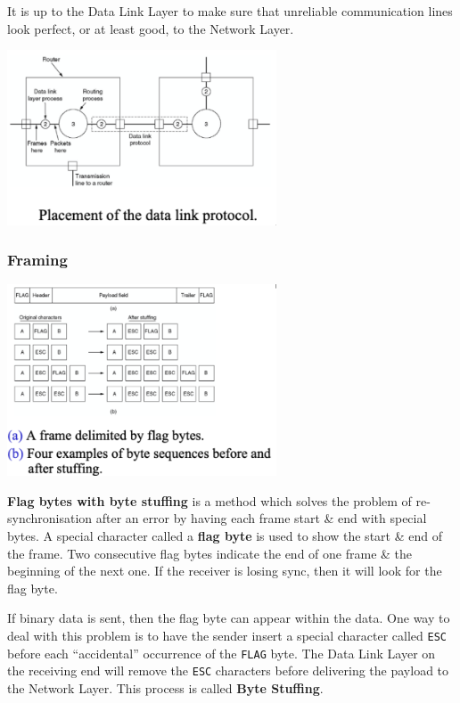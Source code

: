\documentclass[11pt]{article}
\begin{document}
It is up to the Data Link Layer to make sure that unreliable communication lines look perfect, or at least good, to the 
Network Layer.
\begin{center}
    \includegraphics[width=0.6\textwidth]{placementofthedatalinkprotocol.png}
\end{center}

\subsubsection{Framing}
\begin{center}
    \includegraphics[width=0.6\textwidth]{framing1.png}
\end{center}

\textbf{Flag bytes with byte stuffing} is a method which solves the problem of re-synchronisation after an error by 
having each frame start \& end with special bytes. 
A special character called a \textbf{flag byte} is used to show the start \& end of the frame. 
Two consecutive flag bytes indicate the end of one frame \& the beginning of the next one. 
If the receiver is losing sync, then it will look for the flag byte.

If binary data is sent, then the flag byte can appear within the data. 
One way to deal with this problem is to have the sender insert a special character called \verb|ESC| before each 
``accidental'' occurrence of the \verb|FLAG| byte. 
The Data Link Layer on the receiving end will remove the \verb|ESC| characters before delivering the payload to the 
Network Layer. 
This process is called \textbf{Byte Stuffing}.
\end{document}
